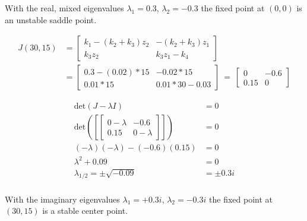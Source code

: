 \documentclass[]{scrartcl}
\begin{document}
With the real, mixed eigenvalues $\lambda_1 = 0.3$, $\lambda_2 = -0.3$ the fixed point at $(0,0)$ is an unstable saddle point.


\begin{center}
\begin{align*}
J(30,15) &=
\begin{bmatrix}
  k_1 - (k_2 + k_3) z_2 & - (k_2 + k_3) z_1 \\[1ex] %
  k_3 z_2 & k_3 z_1 - k_4
\end{bmatrix} \\
&= \begin{bmatrix}
  0.3 - (0.02) * 15 & -0.02 * 15 \\[1ex] %
  0.01 * 15 & 0.01 * 30 - 0.03
\end{bmatrix} ~=~
\begin{bmatrix}
  0 & -0.6 \\[1ex] %
  0.15 & 0
\end{bmatrix}
\end{align*}
\end{center}

\begin{center}
\begin{align*}
	\textrm{det}(J - \lambda I) &= 0 \\
	\textrm{det} \left( \left[ \begin{bmatrix}
  		0 - \lambda & -0.6 \\[1ex] %
  		0.15 & 0 - \lambda
	\end{bmatrix} \right] \right) &= 0 \\
	(-\lambda)(-\lambda) - (-0.6)(0.15) &= 0 \\
	\lambda^2 + 0.09 &= 0 \\
	\lambda_{1/2} = \pm \sqrt{-0.09} &= \pm 0.3i \\
\end{align*}
\end{center}


With the imaginary eigenvalues $\lambda_1 = +0.3i$, $\lambda_2 = -0.3i$ the fixed point at $(30,15)$ is a stable center point.
\end{document}
